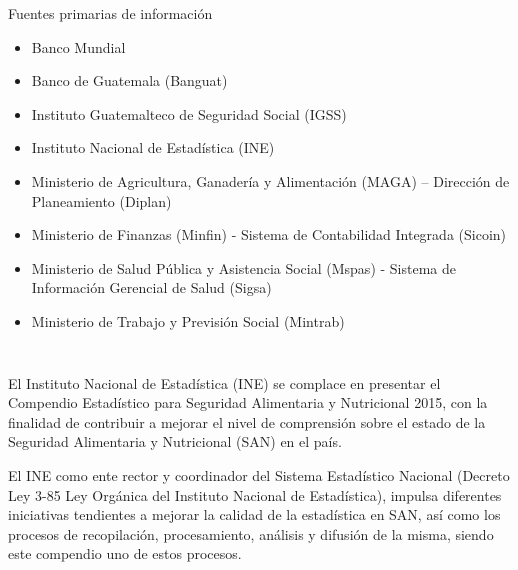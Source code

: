 $\ $
\vspace{1cm}

\begin{center}
	{\Bold \LARGE Fuentes primarias de información}\\[2cm]
	
	\begin{itemize}
			\item Banco Mundial
			\item 	Banco de Guatemala (Banguat)
			\item 	Instituto Guatemalteco de Seguridad Social (IGSS)
			\item 	Instituto Nacional de Estadística (INE)
			\item 	Ministerio de Agricultura, Ganadería y Alimentación (MAGA) – Dirección de Planeamiento (Diplan)
			\item 	Ministerio de Finanzas (Minfin) - Sistema de Contabilidad Integrada (Sicoin)
			\item 	Ministerio de Salud Pública y Asistencia Social (Mspas) - Sistema de Información Gerencial de Salud (Sigsa)
			\item 	Ministerio de Trabajo y Previsión Social (Mintrab)
			
	\end{itemize}	
	
\end{center}\setcounter{page}{0}\cleardoublepage



$\ $\\[1cm]

\tableofcontents

\cleardoublepage
	\pagestyle{estandar}
	\setcounter{page}{1}
	\setlength{\arrayrulewidth}{1.0pt}





\cleardoublepage


$\ $\\[2cm]
\thispagestyle{empty}
\indent{}




$\ $\\[0.5cm]
\large
\indent El Instituto Nacional de Estadística 	(INE) se complace en presentar el Compendio Estadístico para Seguridad Alimentaria y Nutricional 2015, con la finalidad de contribuir a mejorar el nivel de comprensión sobre el estado de la Seguridad Alimentaria y Nutricional (SAN) en el país.

El INE como ente rector y coordinador del Sistema Estadístico Nacional (Decreto Ley 3-85 Ley Orgánica del Instituto Nacional de Estadística), impulsa diferentes iniciativas tendientes a mejorar la calidad de la estadística en SAN, así como los procesos de recopilación, procesamiento, análisis y difusión de la misma, siendo este compendio uno de estos procesos.

